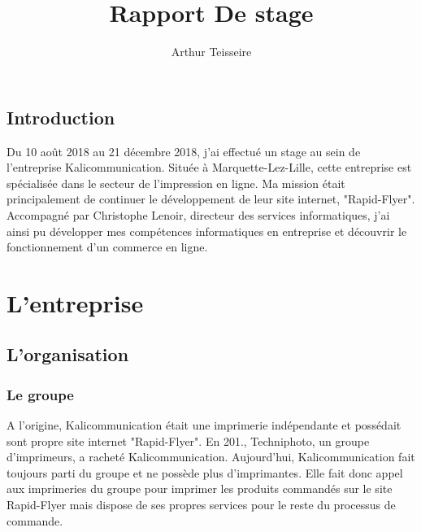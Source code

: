 \documentclass[a4paper]{report}
\title{Rapport De stage}
\author{Arthur Teisseire}
\begin{document}
\renewcommand{\contentsname}{Sommaire}
\renewcommand{\thesection}{\arabic{section}}
\tableofcontents
\chapter*{Introduction}
 
Du 10 août 2018 au 21 décembre 2018, j'ai effectué un stage au sein de l'entreprise Kalicommunication.
Située à Marquette-Lez-Lille, cette entreprise est spécialisée dans le secteur de l'impression en ligne.\newline
Ma mission était principalement de continuer le développement de leur site internet, "Rapid-Flyer".
Accompagné par Christophe Lenoir, directeur des services informatiques, j'ai ainsi pu développer mes compétences informatiques en entreprise et découvrir le fonctionnement d'un commerce en ligne.
\part{L'entreprise}
\chapter*{L'organisation}
 
\section{Le groupe}
A l'origine, Kalicommunication était une imprimerie indépendante et possédait sont propre site internet "Rapid-Flyer".\newline
En 201., Techniphoto, un groupe d'imprimeurs, a racheté Kalicommunication. Aujourd'hui, Kalicommunication fait toujours parti du groupe et ne possède plus d'imprimantes. Elle fait donc appel aux imprimeries du groupe pour imprimer les produits commandés sur le site Rapid-Flyer mais dispose de ses propres services pour le reste du processus de commande.
\end{document}
